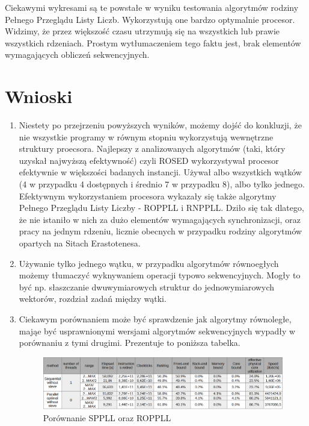 \documentclass{article}
\begin{document}
            Ciekawymi wykresami są te powstałe w wyniku testowania algorytmów rodziny Pełnego Przeglądu Listy Liczb. Wykorzystują one bardzo optymalnie procesor. Widzimy, że przez większość czasu utrzymują się na wszystkich lub prawie wszystkich rdzeniach. Prostym wytłumaczeniem tego faktu jest, brak elementów wymagających obliczeń sekwencyjnych.
            
            
                
    \section{Wnioski}    
        \begin{enumerate}
            \item Niestety po przejrzeniu powyższych wyników, możemy dojść do konkluzji, że nie wszystkie programy w równym stopniu wykorzystują wewnętrzne struktury proecsora. Najlepszy z analizowanych algorytmów (taki, który uzyskał najwyższą efektywność) czyli \gls{ROSED} wykorzystywał procesor efektywnie w większości badanych instancji. Używał albo wszystkich wątków (4 w przypadku 4 dostępnych i średnio 7 w przypadku 8), albo tylko jednego. Efektywnym wykorzystaniem procesora wykazały się także algorytmy Pełnego Przeglądu Listy Liczby - \gls{ROPPLL} i \gls{RNPPLL}. Dziło się tak dlatego, że nie istaniło w nich za dużo elementów wymagających synchronizacji, oraz pracy na jednym rdzeniu, licznie obecnych w przypadku rodziny algorytmów opartych na Sitach Erastotenesa.
            \item Używanie tylko jednego wątku, w przypadku algorytmów równoegłych możemy tłumaczyć wyknywaniem operacji typowo sekwencyjnych. Mogły to być np. słaszczanie dwuwymiarowych struktur do jednowymiarowych wektorów, rozdział zadań między wątki.
            \item Ciekawym porównaniem może być sprawdzenie jak algorytmy równoległe, mająe być usprawnionymi wersjami algorytmów sekwencyjnych wypadły w porównaniu z tymi drugimi. Prezentuje to poniższa tabelka.
                \begin{figure}[H]
                    \includegraphics[width=13cm]{parallel-seq-comp.png}
                    \caption{Porównanie \gls{SPPLL} oraz \gls{ROPPLL}}

\end{figure}
\end{enumerate}
\end{document}
